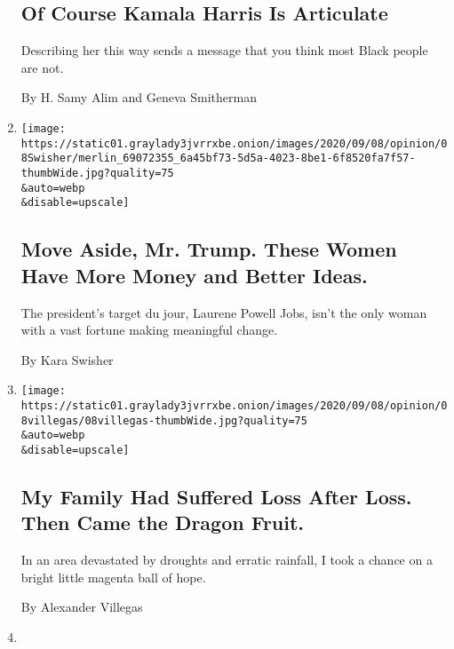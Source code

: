 \begin{enumerate}
  \hypertarget{of-course-kamala-harris-is-articulate}{%
  \subsection{Of Course Kamala Harris Is
  Articulate}\label{of-course-kamala-harris-is-articulate}}

  Describing her this way sends a message that you think most Black
  people are not.

  By H. Samy Alim and Geneva Smitherman
\item
  \href{/2020/09/08/opinion/trump-powell-jobs-atlantic.html}{}

  \texttt{[image: https://static01.graylady3jvrrxbe.onion/images/2020/09/08/opinion/08Swisher/merlin\_69072355\_6a45bf73-5d5a-4023-8be1-6f8520fa7f57-thumbWide.jpg?quality=75\\\&auto=webp\\\&disable=upscale]}

  \hypertarget{move-aside-mr-trump-these-women-have-more-money-and-better-ideas}{%
  \subsection{Move Aside, Mr. Trump. These Women Have More Money and
  Better
  Ideas.}\label{move-aside-mr-trump-these-women-have-more-money-and-better-ideas}}

  The president's target du jour, Laurene Powell Jobs, isn't the only
  woman with a vast fortune making meaningful change.

  By Kara Swisher
\item
  \href{/2020/09/08/opinion/costa-rica-climate-change.html}{}

  \texttt{[image: https://static01.graylady3jvrrxbe.onion/images/2020/09/08/opinion/08villegas/08villegas-thumbWide.jpg?quality=75\\\&auto=webp\\\&disable=upscale]}

  \hypertarget{my-family-had-suffered-loss-after-loss-then-came-the-dragon-fruit}{%
  \subsection{My Family Had Suffered Loss After Loss. Then Came the
  Dragon
  Fruit.}\label{my-family-had-suffered-loss-after-loss-then-came-the-dragon-fruit}}

  In an area devastated by droughts and erratic rainfall, I took a
  chance on a bright little magenta ball of hope.

  By Alexander Villegas
\item
  \href{/2020/09/08/opinion/international-baccalaureate-algorithm-grades.html}{}


\end{enumerate}
